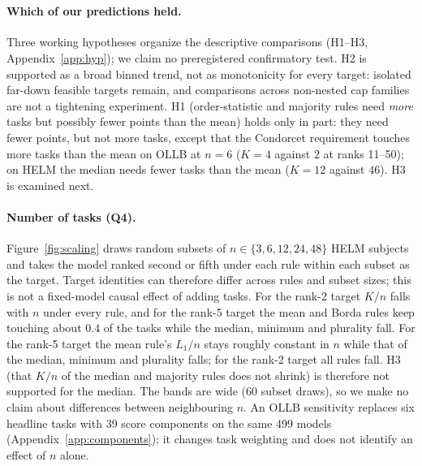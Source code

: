 \documentclass{article}
\begin{document}
\begin{table}[t]
\caption{Median investment to become first among feasible targets, by rank stratum and rule, primary caps: OLLB (\texttt{emp99}, top) and HELM (\texttt{emp99T}, bottom). ``feas.'' = feasible targets / targets in the stratum; $K$, $L_1$ with 95\% bootstrap intervals over targets; The ratio is the median per-target $L_1$ relative to the mean over targets feasible under both; the final column gives the paired count. Intervals use 2000 target-bootstrap resamples with deterministic data-derived seeds; repeated rows reuse draws. OLLB Borda and Condorcet use targets at ranks 2--50 only. Generated by \texttt{figures/src/tables.py}.}
\label{tab:T3}
\centering\scriptsize
\\[4pt]

\end{table}

\paragraph{Which of our predictions held.}
Three working hypotheses organize the descriptive comparisons (H1--H3, Appendix~\ref{app:hyp}); we claim no preregistered confirmatory test. H2 is supported as a broad binned trend, not as monotonicity for every target: isolated far-down feasible targets remain, and comparisons across non-nested cap families are not a tightening experiment. H1 (order-statistic and majority rules need \emph{more} tasks but possibly fewer points than the mean) holds only in part: they need fewer points, but not more tasks, except that the Condorcet requirement touches more tasks than the mean on OLLB at $n=6$ ($K=4$ against $2$ at ranks 11--50); on HELM the median needs fewer tasks than the mean ($K=12$ against $46$). H3 is examined next.

\paragraph{Number of tasks (Q4).}
Figure~\ref{fig:scaling} draws random subsets of $n\in\{3,6,12,24,48\}$ HELM subjects and takes the model ranked second or fifth under each rule within each subset as the target. Target identities can therefore differ across rules and subset sizes; this is not a fixed-model causal effect of adding tasks. For the rank-2 target $K/n$ falls with $n$ under every rule, and for the rank-5 target the mean and Borda rules keep touching about $0.4$ of the tasks while the median, minimum and plurality fall. For the rank-5 target the mean rule's $L_1/n$ stays roughly constant in $n$ while that of the median, minimum and plurality falls; for the rank-2 target all rules fall. H3 (that $K/n$ of the median and majority rules does not shrink) is therefore not supported for the median. The bands are wide (60 subset draws), so we make no claim about differences between neighbouring $n$. An OLLB sensitivity replaces six headline tasks with 39 score components on the same 499 models (Appendix~\ref{app:components}); it changes task weighting and does not identify an effect of $n$ alone.
\end{document}
